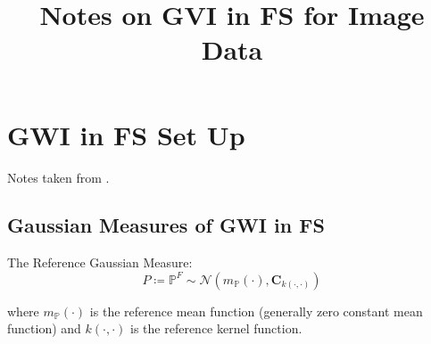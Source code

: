 \documentclass[twoside,11pt]{article}
\begin{document}
\title{Notes on GVI in FS for Image Data}



\maketitle




\section{GWI in FS Set Up}\label{sec:gwi-in-fs-set-up}

Notes taken from \cite{wild2022generalized}.

\subsection{Gaussian Measures of GWI in FS}\label{sec:gaussian-measures-of-gwi-in-fs}

The Reference Gaussian Measure:
\[P \coloneqq \mathbb{P}^{F} \sim \mathcal{N} (m_{\mathbb{P}}(\cdot), \mathbf{C}_{k(\cdot, \cdot)})\]

where $m_{\mathbb{P}}(\cdot)$ is the reference mean function (generally zero constant mean function) and $k(\cdot, \cdot)$ is the reference kernel function.
\end{document}
